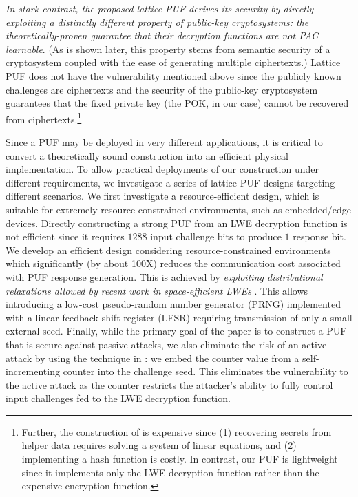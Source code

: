 \emph{In stark contrast, the proposed lattice PUF derives its security by directly exploiting a distinctly different property of public-key cryptosystems: the theoretically-proven guarantee that their decryption functions are not PAC learnable}. 
(As is shown later, this property stems from semantic security of a cryptosystem coupled with the ease of generating multiple ciphertexts.) 
Lattice PUF does not have the vulnerability mentioned above since the publicly known challenges are ciphertexts and the security of the public-key cryptosystem guarantees that the fixed private key (the POK, in our case) cannot be recovered from ciphertexts.\footnote{Further, the construction of  \cite{fuller2013computational,herder2017trapdoor,jin2017fpga} is expensive since (1) recovering secrets from helper data requires solving a system of linear equations, and (2) implementing a hash function is costly.  
In contrast, our PUF is lightweight since it implements only the LWE decryption function rather than the expensive encryption function.}

Since a PUF may be deployed in very different applications, it is critical to convert a theoretically sound construction into an efficient physical implementation. To allow practical deployments of our construction under different requirements, we investigate a series of lattice PUF designs targeting different scenarios. We first investigate a resource-efficient design, which is suitable for extremely resource-constrained environments, such as embedded/edge devices. Directly constructing a strong PUF from an LWE decryption function is not efficient since it requires $1288$ input challenge bits to produce $1$ response bit.
We develop an efficient design considering resource-constrained environments which significantly (by about 100X) reduces the communication cost associated with PUF response generation.
This is achieved by \emph{exploiting distributional relaxations allowed by recent work in space-efficient LWEs} \cite{galbraith2013space}.
This allows introducing a low-cost pseudo-random number generator (PRNG) implemented with a linear-feedback shift register (LFSR) requiring transmission of only a small external seed. 
Finally, while the primary goal of the paper is to construct a PUF that is secure against passive attacks, we also eliminate the risk of an active attack by using the technique in \cite{yu2016lockdown}: we embed the counter value from a self-incrementing counter into the challenge seed.
This eliminates the vulnerability to the active attack as the counter restricts the attacker's ability to fully control input challenges fed to the LWE decryption function.

